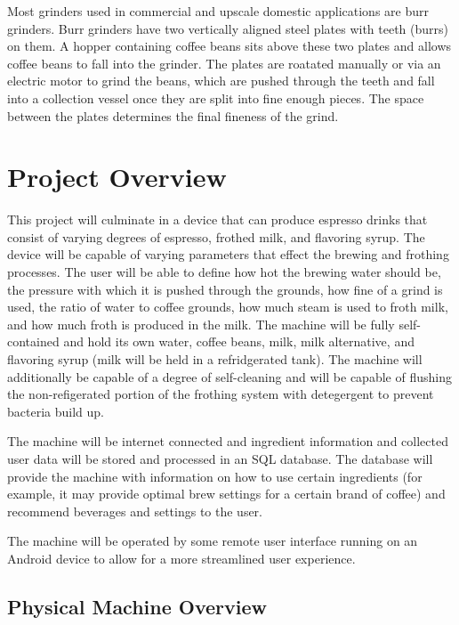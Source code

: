 \documentclass[conference]{IEEEtran}
\begin{document}
Most grinders used in commercial and upscale domestic applications are burr
grinders. Burr grinders have two vertically aligned steel plates with teeth
(burrs) on them. A hopper containing coffee beans sits above these two plates
and allows coffee beans to fall into the grinder.
The plates are roatated manually or via an electric motor to grind the beans,
which are pushed through the teeth and fall into a collection vessel once they
are split into fine enough pieces.
The space between the plates determines the final fineness of the grind.


\section{Project Overview}

This project will culminate in a device that can produce espresso drinks that
consist of varying degrees of espresso, frothed milk, and flavoring syrup. The
device will be capable of varying parameters that effect the brewing and
frothing processes. The user will be able to define how hot the brewing water
should be, the pressure with which it is pushed through the grounds, how fine of
a grind is used, the ratio of water to coffee grounds, how much steam is used to
froth milk, and how much froth is produced in the milk. The machine will be
fully self-contained and hold its own water, coffee beans, milk, milk
alternative, and flavoring syrup (milk will be held in a refridgerated tank).
The machine will additionally be capable of a degree of self-cleaning and will
be capable of flushing the non-refigerated portion of the frothing system with
detegergent to prevent bacteria build up.

The machine will be internet connected and ingredient information and collected user data will be stored and processed in an SQL database. The
database will provide the machine with information on how to use certain
ingredients (for example, it may provide optimal brew settings for a certain
brand of coffee) and recommend beverages and settings to the user.

The machine will be operated by some remote user interface running on an Android
device to allow for a more  streamlined user experience.

\subsection{Physical Machine Overview}
\end{document}
